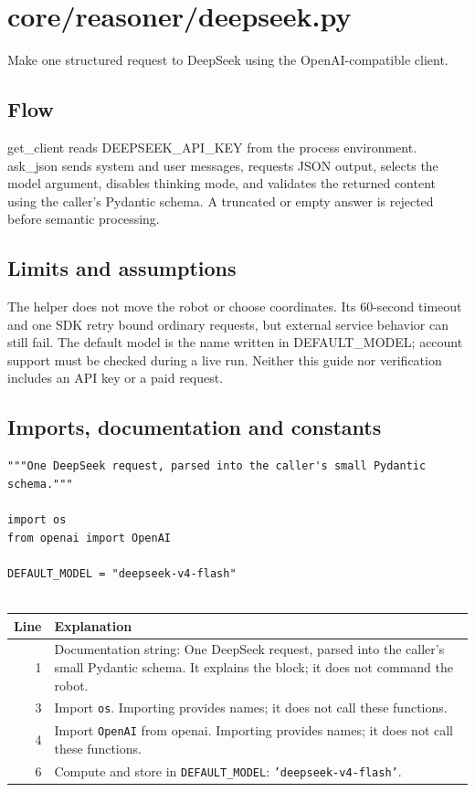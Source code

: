 \documentclass[11pt,a4paper]{book}
\begin{document}
\chapter{core/reasoner/deepseek.py}

Make one structured request to DeepSeek using the OpenAI-compatible client.

\section*{Flow}

get\_client reads DEEPSEEK\_API\_KEY from the process environment. ask\_json sends system and user messages, requests JSON output, selects the model argument, disables thinking mode, and validates the returned content using the caller's Pydantic schema. A truncated or empty answer is rejected before semantic processing.

\section*{Limits and assumptions}

The helper does not move the robot or choose coordinates. Its 60-second timeout and one SDK retry bound ordinary requests, but external service behavior can still fail. The default model is the name written in DEFAULT\_MODEL; account support must be checked during a live run. Neither this guide nor verification includes an API key or a paid request.

\section{Imports, documentation and constants}

\begin{lstlisting}[firstnumber=1]
"""One DeepSeek request, parsed into the caller's small Pydantic schema."""

import os
from openai import OpenAI

DEFAULT_MODEL = "deepseek-v4-flash"


\end{lstlisting}

\begin{longtable}{r p{}}

\textbf{Line} & \textbf{Explanation} \\ \hline \endhead

1 & Documentation string: One DeepSeek request, parsed into the caller's small Pydantic schema. It explains the block; it does not command the robot. \\

3 & Import \texttt{os}. Importing provides names; it does not call these functions. \\

4 & Import \texttt{OpenAI} from openai. Importing provides names; it does not call these functions. \\

6 & Compute and store in \texttt{DEFAULT\_MODEL}: \texttt{'deepseek-v4-flash'}.  \\

\end{longtable}
\end{document}
